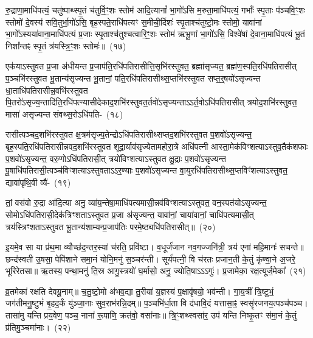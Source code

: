 रु॒द्राणा॒माधि॑पत्यं॒ चतु॑ष्पाथ्स्पृ॒तं च॑तुर्वि॒ꣳ॒शः स्तोम॑ आदि॒त्यानां᳚ भा॒गो॑\-ऽसि म॒रुता॒माधि॑पत्यं॒ गर्भाः᳚ स्पृ॒ताः प॑ञ्च\-वि॒ꣳ॒शः स्तोमो॑ दे॒वस्य॑ सवि॒तुर्भा॒गो॑\-ऽसि॒ बृह॒स्पते॒राधि॑पत्यꣳ स॒मीची॒र्दिशः॑ स्पृ॒ताश्च॑तुष्टो॒मः स्तोमो॒ यावा॑नां भा॒गो᳚\-ऽस्यया॑वाना॒माधि॑पत्यं प्र॒जाः स्पृ॒ताश्च॑तुश्चत्वारि॒ꣳ॒शः स्तोम॑ ऋभू॒णां भा॒गो॑\-ऽसि॒ विश्वे॑षां दे॒वाना॒माधि॑पत्यं भू॒तं निशा᳚न्तꣴ स्पृ॒तं त्र॑यस्त्रि॒ꣳ॒शः स्तोमः॑॥~(१७)\ip

{\anuvakamend[{वसू॑नां भा॒गो॑\-ऽसि॒ षट्च॑त्वारिꣳशच्च}]}

एक॑याऽस्तुवत प्र॒जा अ॑धीयन्त प्र॒जा\-प॑ति॒रधि॑\-पतिरासीत्ति॒सृभि॑\-रस्तुवत॒ ब्रह्मा॑सृज्यत॒ ब्रह्म॑ण॒स्पति॒रधि॑\-पतिरासीत् प॒ञ्चभि॑\-रस्तुवत भू॒तान्य॑सृज्यन्त भू॒तानां॒ पति॒रधि॑\-पतिरासीथ्स॒प्तभि॑\-रस्तुवत सप्त॒र्॒\mbox{}षयो॑\-ऽ\-सृज्यन्त धा॒ताधि॑\-पतिरा\-सीन्न॒वभि॑\-रस्तुवत पि॒तरो॑\-ऽसृज्य॒न्ता\-दि॑ति॒\-रधि॑\-पत्न्यासीदेकाद॒शभि॑\-रस्तुवत॒र्तवो॑\-ऽसृज्यन्ता\-ऽऽ\-र्त॒वो\-ऽधि॑\-पतिरासीत् त्रयोद॒शभि॑\-रस्तुवत॒ मासा॑ असृज्यन्त संवथ्स॒रो\-ऽधि॑\-पति-~(१८)\ip

रासीत्पञ्चद॒शभि॑\-रस्तुवत क्ष॒त्रम॑सृज्य॒तेन्द्रो\-ऽधि॑\-पतिरासीथ्सप्त\-द॒शभि॑\-रस्तुवत प॒शवो॑\-ऽसृज्यन्त॒ बृह॒स्पति॒\-रधि॑\-पतिरासी\-न्नव\-द॒शभि॑\-रस्तुवत शूद्रा॒र्याव॑सृज्येतामहोरा॒त्रे अधि॑पत्नी आस्ता॒\-मेक॑\-विꣳशत्या\-ऽ\-स्तुव॒तैक॑शफाः प॒शवो॑\-ऽसृज्यन्त॒ वरु॒णो\-ऽधि॑\-पतिरासी॒त् त्रयो॑\-विꣳशत्या\-ऽ\-स्तुवत क्षु॒द्राः प॒शवो॑\-ऽसृज्यन्त पू॒षाधि॑\-पतिरासी॒त्पञ्च॑विꣳशत्या\-ऽ\-स्तुवता\-ऽऽ\-र॒ण्याः प॒शवो॑\-ऽसृज्यन्त वा॒यु\-रधि॑\-पतिरासीथ्स॒प्तविꣳ॑शत्या\-ऽ\-स्तुवत॒ द्यावा॑\-पृथि॒वी व्यै॑-~(१९)\ip

तां॒ वस॑वो रु॒द्रा आ॑दि॒त्या अनु॒ व्या॑य॒न्तेषा॒माधि॑\-पत्यमासी॒न्नव॑\-विꣳशत्या\-ऽ\-स्तुवत॒ वन॒स्पत॑यो\-ऽसृज्यन्त॒ सोमो\-ऽ\-धि॑\-पतिरासी॒देक॑त्रिꣳशता\-ऽ\-स्तुवत प्र॒जा अ॑सृज्यन्त॒ यावा॑नां॒ चाया॑वानां॒ चाधि॑पत्यमासी॒त् त्रय॑स्त्रिꣳशता\-ऽ\-स्तुवत भू॒तान्य॑शाम्यन्प्र॒जा\-प॑तिः परमे॒ष्ठ्यधि॑\-पतिरासीत्॥~(२०)\ip

{\anuvakamend[{सं॒ व॒थ्स॒रो\-ऽधि॑\-पति॒र्वि पञ्च॑त्रिꣳशच्च}]}%

इ॒यमे॒व सा या प्र॑थ॒मा व्यौच्छ॑द॒न्तर॒स्यां च॑रति॒ प्रवि॑ष्टा। व॒धूर्ज॑जान नव॒गज्जनि॑त्री॒ त्रय॑ एनां महि॒मानः॑ सचन्ते॥ छन्द॑स्वती उ॒षसा॒ पेपि॑शाने समा॒नं योनि॒मनु॑ स॒ञ्चर॑न्ती। सूर्य॑पत्नी॒ वि च॑रतः प्रजान॒ती के॒तुं कृ॑ण्वा॒ने अ॒जरे॒ भूरि॑रेतसा॥ ऋ॒तस्य॒ पन्था॒मनु॑ ति॒स्र आगु॒स्त्रयो॑ घ॒र्मासो॒ अनु॒ ज्योति॒षा\-ऽऽ\-ऽगुः॑। प्र॒जामेका॒ रक्ष॒त्यूर्ज॒मेका᳚~(२१)\ip

व्र॒तमेका॑ रक्षति देवयू॒नाम्॥ च॒तु॒ष्टो॒मो अ॑भव॒द्या तु॒रीया॑ य॒ज्ञस्य॑ प॒क्षावृ॑षयो॒ भव॑न्ती। गा॒य॒त्रीं त्रि॒ष्टुभं॒ जग॑तीमनु॒ष्टुभं॑ बृ॒हद॒र्कं यु॑ञ्जा॒नाः सुव॒राभ॑रन्नि॒दम्॥ प॒ञ्चभि॑र्धा॒ता वि द॑धावि॒दं यत्तासा॒ꣴ॒ स्वसॄ॑रजनय॒त्पञ्च॑पञ्च। तासा॑मु यन्ति प्रय॒वेण॒ पञ्च॒ नाना॑ रू॒पाणि॒ क्रत॑वो॒ वसा॑नाः॥ त्रि॒ꣳ॒शथ्स्वसा॑र॒ उप॑ यन्ति निष्कृ॒तꣳ स॑मा॒नं के॒तुं प्र॑तिमु॒ञ्चमा॑नाः।~(२२)\ip

